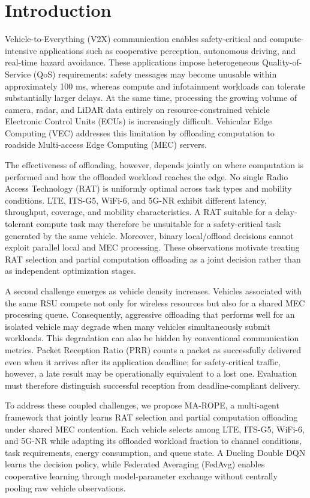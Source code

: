 \section{Introduction}

Vehicle-to-Everything (V2X) communication enables safety-critical and compute-intensive applications such as cooperative perception, autonomous driving, and real-time hazard avoidance. These applications impose heterogeneous Quality-of-Service (QoS) requirements: safety messages may become unusable within approximately 100 ms, whereas compute and infotainment workloads can tolerate substantially larger delays. At the same time, processing the growing volume of camera, radar, and LiDAR data entirely on resource-constrained vehicle Electronic Control Units (ECUs) is increasingly difficult. Vehicular Edge Computing (VEC) addresses this limitation by offloading computation to roadside Multi-access Edge Computing (MEC) servers.

The effectiveness of offloading, however, depends jointly on where computation is performed and how the offloaded workload reaches the edge. No single Radio Access Technology (RAT) is uniformly optimal across task types and mobility conditions. LTE, ITS-G5, WiFi-6, and 5G-NR exhibit different latency, throughput, coverage, and mobility characteristics. A RAT suitable for a delay-tolerant compute task may therefore be unsuitable for a safety-critical task generated by the same vehicle. Moreover, binary local/offload decisions cannot exploit parallel local and MEC processing. These observations motivate treating RAT selection and partial computation offloading as a joint decision rather than as independent optimization stages.

A second challenge emerges as vehicle density increases. Vehicles associated with the same RSU compete not only for wireless resources but also for a shared MEC processing queue. Consequently, aggressive offloading that performs well for an isolated vehicle may degrade when many vehicles simultaneously submit workloads. This degradation can also be hidden by conventional communication metrics. Packet Reception Ratio (PRR) counts a packet as successfully delivered even when it arrives after its application deadline; for safety-critical traffic, however, a late result may be operationally equivalent to a lost one. Evaluation must therefore distinguish successful reception from deadline-compliant delivery.

To address these coupled challenges, we propose MA-ROPE, a multi-agent framework that jointly learns RAT selection and partial computation offloading under shared MEC contention. Each vehicle selects among LTE, ITS-G5, WiFi-6, and 5G-NR while adapting its offloaded workload fraction to channel conditions, task requirements, energy consumption, and queue state. A Dueling Double DQN learns the decision policy, while Federated Averaging (FedAvg) enables cooperative learning through model-parameter exchange without centrally pooling raw vehicle observations.

